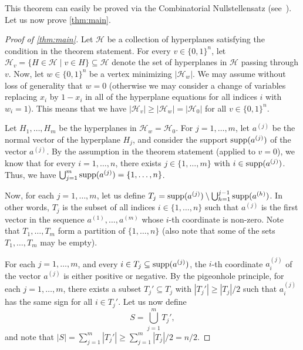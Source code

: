 \documentclass{amsart}
\theoremstyle{remark}
\numberwithin{theorem}{section}
\renewcommand{\(}{\bigl(}
\renewcommand{\)}{\bigr)\vphantom{)}}
\newcommand{\cH}{\mathcal H}
\renewcommand{\ge}{\geqslant}
\newcommand{\bin}{\{0,1\}}
\newcommand{\supp}{\textup{supp}}
\begin{document}
This theorem can easily be proved via the Combinatorial Nullstellensatz (see~\cite[Theorem~6.3]{alon-nullstellensatz99}). Let us now prove \cref{thm:main}.

\begin{proof}[Proof of \cref{thm:main}]
    Let $\cH$ be a collection of hyperplanes satisfying the condition in the theorem statement. For every $v\in \bin^n$, let $\cH_v = \{H\in \cH\mid v\in H\} \subseteq \cH$ denote the set of hyperplanes in $\cH$ passing through $v$. Now, let $w\in \bin^n$ be a vertex minimizing $|\cH_w|$. We may assume without loss of generality that $w=0$ (otherwise we may consider a change of variables replacing $x_i$ by $1-x_i$ in all of the hyperplane equations for all indices $i$ with $w_i = 1$). This means that we have $|\cH_v|\ge |\cH_w|=|\cH_0|$ for all $v\in \bin^n$.

    
    Let $H_1,\dots, H_m$ be the hyperplanes in $\cH_w =\cH_0$. For $j=1,\dots,m$, let $a^{(j)}$ be the normal vector of the hyperplane $H_j$, and consider the support $\supp(a^{(j)})$ of the vector $a^{(j)}$. By the assumption in the theorem statement (applied to $v=0$), we know that for every $i=1,\dots,n$, there exists $j\in \{1,\dots, m\}$ with $i\in \supp(a^{(j)})$. Thus, we have $\bigcup_{j=1}^m \supp(a^{(j)})= \{1,\dots, n\}$.
    
    Now, for each $j=1,\dots,m$, let us define $T_j = \supp(a^{(j)})\setminus \bigcup_{h=1}^{j-1} \supp(a^{(h)})$. In other words, $T_j$ is the subset of all indices $i\in\{1,\dots,n\}$ such that $a^{(j)}$ is the first vector in the sequence $a^{(1)},\dots,a^{(m)}$ whose $i$-th coordinate is non-zero. Note that $T_1,\dots, T_m$ form a partition of $\{1,\dots, n\}$ (also note that some of the sets $T_1,\dots, T_m$ may be empty).
    
    For each $j=1,\dots,m$, and every $i\in T_j\subseteq  \supp(a^{(j)})$, the $i$-th coordinate $a^{(j)}_{i}$ of the vector $a^{(j)}$ is either positive or negative. By the pigeonhole principle, for each $j=1,\dots,m$, there exists a subset $T_j'\subseteq T_j$ with $|T_j'|\ge |T_j|/2$ such that $a^{(j)}_{i}$ has the same sign for all $i\in T_j'$. Let us now define 
     \[S = \bigcup_{j=1}^m T_j',\] 
     and note that $|S| = \sum_{j=1}^{m} |T_j'|\ge \sum_{j=1}^{m} |T_j|/2=n/2$.
     


\end{proof}
\end{document}
